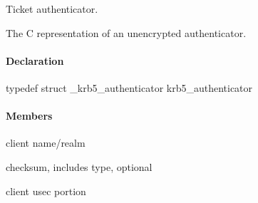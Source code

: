 \documentclass[letterpaper,10pt,english]{sphinxmanual}
\begin{document}
Ticket authenticator.

The C representation of an unencrypted authenticator.


\paragraph{Declaration}
\label{appdev/refs/types/krb5_authenticator:declaration}
typedef struct \_krb5\_authenticator  krb5\_authenticator


\paragraph{Members}
\label{appdev/refs/types/krb5_authenticator:members}

\begin{fulllineitems}
\label{appdev/refs/types/krb5_authenticator:c.krb5_authenticator.magic}
\end{fulllineitems}


\begin{fulllineitems}
\label{appdev/refs/types/krb5_authenticator:c.krb5_authenticator.client}
client name/realm

\end{fulllineitems}


\begin{fulllineitems}
\label{appdev/refs/types/krb5_authenticator:c.krb5_authenticator.checksum}
checksum, includes type, optional

\end{fulllineitems}


\begin{fulllineitems}
\label{appdev/refs/types/krb5_authenticator:c.krb5_authenticator.cusec}
client usec portion

\end{fulllineitems}
\end{document}
